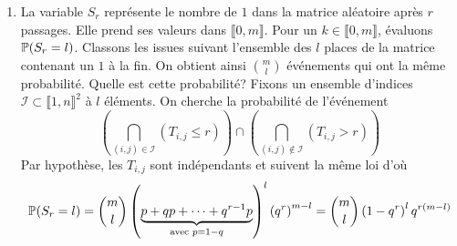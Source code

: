 \begin{enumerate}
  \item La variable $S_r$ représente le nombre de $1$ dans la matrice aléatoire après $r$ passages. Elle prend ses valeurs dans $\llbracket 0,m \rrbracket$. Pour un $k \in \llbracket 0,m \rrbracket$, évaluons $\mathbb{P}(S_r = l)$. Classons les issues suivant l'ensemble des $l$ places de la matrice contenant un $1$ à la fin. On obtient ainsi $\binom{m}{l}$ événements qui ont la même probabilité.\newline
  Quelle est cette probabilité? Fixons un ensemble d'indices $\mathcal{I}\subset \llbracket 1,n\rrbracket^2$ à $l$ éléments. On cherche la probabilité de l'événement
\begin{displaymath}
  \left( \bigcap_{(i,j)\in \mathcal{I}}\left( T_{i,j}\leq r\right)\right)  \cap \left( \bigcap_{(i,j) \notin \mathcal{I}}\left( T_{i,j}> r\right)\right) 
\end{displaymath}
Par hypothèse, les $T_{i,j}$ sont indépendants et suivent la même loi d'où
\begin{displaymath}
\mathbb{P}(S_r = l) = \binom{m}{l}\left(\underset{\text{avec }p=1-q}{\underbrace{p+qp+\cdots+q^{r-1}p}} \right)^l  \left( q^{r}\right)^{m-l} 
= \binom{m}{l}\left( 1-q^r\right)^l q^{r(m-l)}
\end{displaymath}
\end{enumerate}
